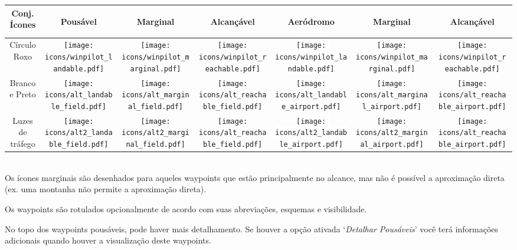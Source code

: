 \begin{tabular}{c|ccc|ccc|}
Conj. Ícones 
&\begin{sideways}Pousável\end{sideways}
&\begin{sideways}Marginal\end{sideways}
&\begin{sideways}Alcançável\end{sideways}
&\begin{sideways}Aeródromo\end{sideways}
&\begin{sideways}Marginal\end{sideways}
&\begin{sideways}Alcançável\end{sideways}\\
\hline
Círculo Roxo &
\texttt{[image: icons/winpilot\_landable.pdf]} &
\texttt{[image: icons/winpilot\_marginal.pdf]} &
\texttt{[image: icons/winpilot\_reachable.pdf]} &
\colorbox{white}{\texttt{[image: icons/winpilot\_landable.pdf]}} &
\texttt{[image: icons/winpilot\_marginal.pdf]} &
\texttt{[image: icons/winpilot\_reachable.pdf]} \\
\hline
Branco e Preto &
\texttt{[image: icons/alt\_landable\_field.pdf]} &
\texttt{[image: icons/alt\_marginal\_field.pdf]} &
\texttt{[image: icons/alt\_reachable\_field.pdf]} &
\colorbox[rgb]{0.94,0.94,0.94}{\texttt{[image: icons/alt\_landable\_airport.pdf]}} &
\texttt{[image: icons/alt\_marginal\_airport.pdf]} &
\texttt{[image: icons/alt\_reachable\_airport.pdf]} \\
\hline
Luzes de tráfego &
\texttt{[image: icons/alt2\_landable\_field.pdf]} &
\texttt{[image: icons/alt2\_marginal\_field.pdf]} &
\texttt{[image: icons/alt\_reachable\_field.pdf]} &
\colorbox{white}{\texttt{[image: icons/alt2\_landable\_airport.pdf]}} &
\texttt{[image: icons/alt2\_marginal\_airport.pdf]} &
\texttt{[image: icons/alt\_reachable\_airport.pdf]} \\
\hline
\end{tabular} \\

Os ícones marginais são desenhados para aqueles waypoints que estão principalmente no alcance, mas não é possível a aproximação direta (ex. uma montanha não permite a aproximação direta).
  
Os waypoints são rotulados opcionalmente de acordo com suas abreviações, esquemas e visibilidade.

No topo dos waypoints pousáveis, pode haver mais detalhamento.  Se houver a opção ativada 
`{\it Detalhar Pousáveis}' você terá informações adicionais quando houver a visualização deste waypoints.

